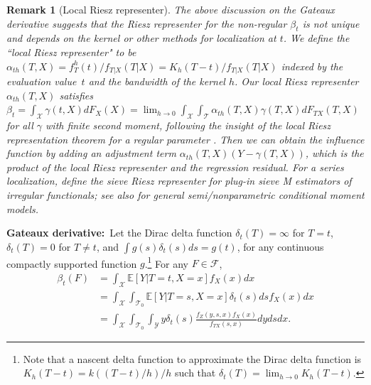 \documentclass[lettersize, 12pt]{article}
\newtheorem{remark}{Remark}
\begin{document}
{%

\begin{remark}[Local Riesz representer]
{\rm 
The above discussion on the Gateaux derivative suggests that the Riesz representer for the non-regular $\beta_t$ is not unique and depends on the kernel or other methods for localization at $t$.
We define the ``{\it local Riesz representer}" to be $\alpha_{th}(T,X) =  f_T^h(t)/f_{T|X}(T|X) = K_h(T-t)/f_{T|X}(T|X)$ indexed by the evaluation value~$t$ and the bandwidth of the kernel $h$.
Our local Riesz representer $\alpha_{th}(T,X)$ satisfies  $ \beta_t 
= \int_{\mathcal{X}} \gamma(t, X) dF_X(X)
= \lim_{h \rightarrow 0} \int_{\mathcal{X}} \int_{\mathcal{T}}  \alpha_{th}(T,X) \gamma(T,X) dF_{TX}(T, X)$ for all $\gamma$ with finite second moment,
following the insight of the local Riesz representation theorem for a regular parameter \citep{Newey94ETA}.
Then we can obtain the influence function by adding an adjustment term $\alpha_{th}(T,X)(Y-\gamma(T,X))$, which is the product of the local Riesz representer and the regression residual.
For a series localization, \cite{CLS14JoE} define the {\it sieve Riesz representer} for plug-in sieve M estimators of irregular functionals;
see also \cite{ChenPouzo15} for general semi/nonparametric conditional moment models. 
}
\end{remark}
\textbf{Gateaux derivative:}\
Let the Dirac delta function $\delta_t(T) = \infty$ for $T=t$, $\delta_t(T) = 0$ for $T\neq t$,
and $\int g(s)\delta_t(s) ds = g(t)$, for any continuous compactly supported function $g$.\footnote{Note that a nascent delta function to approximate the Dirac delta function is  $K_h(T-t) = k((T-t)/h)/h$ such that $\delta_t(T) = \lim_{h \rightarrow 0} K_h(T-t)$.} %
For any $F\in \mathcal{F}$,
\begin{align*}
\beta_t(F) &= 
\int_{\mathcal{X}}  \mathbb{E}[Y|T=t, X=x] f_X(x) dx\\
&= \int_{\mathcal{X}}\int_{\mathcal{T}_0}  \mathbb{E}[Y|T=s, X=x] \delta_t(s)ds f_X(x) dx \\
&=
\int_{\mathcal{X}}\int_{\mathcal{T}_0} \int_{\mathcal{Y}} y\delta_t(s)  \frac{f_{Z}(y,s,x) f_{X}(x)}{f_{TX}(s,x)} dy dsdx.
\end{align*}

}
\end{document}
